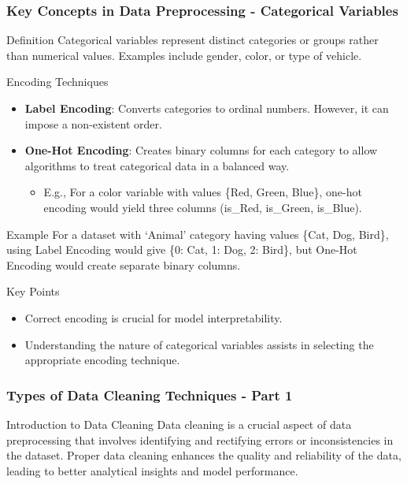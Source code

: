 \documentclass[aspectratio=169]{beamer}
\begin{document}
\begin{frame}[fragile]
    \frametitle{Key Concepts in Data Preprocessing - Categorical Variables}
    \begin{block}{Definition}
        Categorical variables represent distinct categories or groups rather than numerical values. 
        Examples include gender, color, or type of vehicle.
    \end{block}

    \begin{block}{Encoding Techniques}
        \begin{itemize}
            \item \textbf{Label Encoding}: Converts categories to ordinal numbers. However, it can impose a non-existent order.
            \item \textbf{One-Hot Encoding}: Creates binary columns for each category to allow algorithms to treat categorical data in a balanced way.
            \begin{itemize}
                \item E.g., For a color variable with values \{Red, Green, Blue\}, one-hot encoding would yield 
                three columns (is\_Red, is\_Green, is\_Blue).
            \end{itemize}
        \end{itemize}
    \end{block}

    \begin{block}{Example}
        For a dataset with ‘Animal’ category having values \{Cat, Dog, Bird\}, using Label Encoding would give 
        \{0: Cat, 1: Dog, 2: Bird\}, but One-Hot Encoding would create separate binary columns. 
    \end{block}

    \begin{block}{Key Points}
        \begin{itemize}
            \item Correct encoding is crucial for model interpretability.
            \item Understanding the nature of categorical variables assists in selecting the appropriate encoding technique.
        \end{itemize}
    \end{block}
\end{frame}

\begin{frame}[fragile]
    \frametitle{Types of Data Cleaning Techniques - Part 1}
    \begin{block}{Introduction to Data Cleaning}
        Data cleaning is a crucial aspect of data preprocessing that involves identifying and rectifying errors or inconsistencies in the dataset. Proper data cleaning enhances the quality and reliability of the data, leading to better analytical insights and model performance.
    \end{block}
\end{frame}
\end{document}
